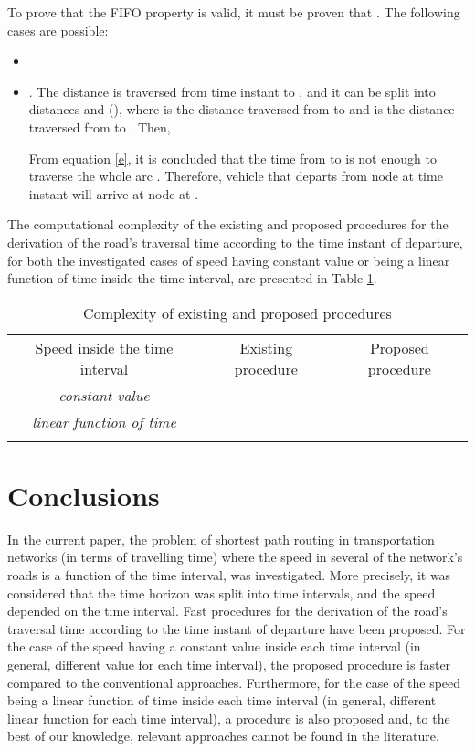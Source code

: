 \documentclass[conference]{IEEEtran}
\begin{document}
To prove that the FIFO property is valid, it must be proven that . The following cases are possible:
\begin{itemize}
    \item 
    \item . The distance  is traversed from time instant  to , and it can be split into distances  and  (), where  is the distance traversed from  to  and  is the distance traversed from  to . Then,
    
        

From equation \ref{e}, it is concluded that the time from  to  is not enough to traverse the whole arc . Therefore, vehicle  that departs from node  at time instant  will arrive at node   at .   
\end{itemize}

The computational complexity of the existing and proposed procedures for the derivation of the road's traversal time according to the time instant of departure, for both the investigated cases of speed having constant value or being a linear function of time inside the time interval, are presented in Table \ref{contrib}.

\begin{table}
\caption{Complexity of existing and proposed procedures}
\label{contrib}
\begin{footnotesize} 
\begin{center} 
\begin{tabular}{ccc}
\hline\noalign{\smallskip}
 Speed inside the time interval & Existing procedure & Proposed procedure   \\
\noalign{\smallskip}\hline\noalign{\smallskip}
\emph{constant value} &  &    \\
\emph{linear function of time} &  &  \\
\noalign{\smallskip}\hline
\end{tabular}
\end{center} 
\end{footnotesize}  
\end{table}

\section{Conclusions}    \label{conclusions}

In the  current paper, the problem of shortest path routing in transportation networks (in terms of travelling time) where the speed in several of the network's roads is a function of the time interval, was investigated. More precisely, it was considered that the time horizon was split into time intervals, and the speed depended on the time interval. Fast procedures for the derivation of the road's traversal time according to the time instant of departure have been proposed. For the case of the speed having a constant value inside each time interval (in general, different value for each time interval), the proposed procedure is faster compared to the conventional approaches. Furthermore, for the case of the speed being a linear function of time inside each time interval (in general, different linear function for each time interval), a procedure is also proposed and, to the best of our knowledge, relevant approaches cannot be found in the literature.  
 
\end{document}
